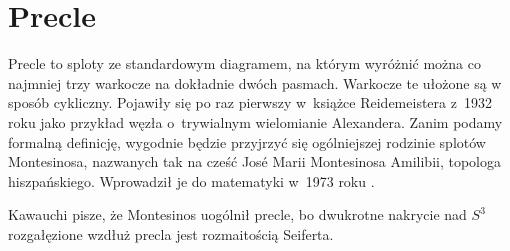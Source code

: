 
\section{Precle}
%
%
Precle to sploty ze standardowym diagramem, na którym wyróżnić można co najmniej trzy warkocze na dokładnie dwóch pasmach.
Warkocze te ułożone są w sposób cykliczny.
Pojawiły się po raz pierwszy w~książce Reidemeistera z~1932 roku jako przykład węzła o~trywialnym wielomianie Alexandera.
Zanim podamy formalną definicję, wygodnie będzie przyjrzyć się ogólniejszej rodzinie splotów Montesinosa, nazwanych tak na cześć José Marii Montesinosa Amilibii, topologa hiszpańskiego.
%
Wprowadził je do matematyki w~1973 roku \cite{montesinos1973}.

Kawauchi \cite[s. 29]{kawauchi1996} pisze, że Montesinos uogólnił precle, bo dwukrotne nakrycie nad $S^3$ rozgałęzione wzdłuż precla jest rozmaitością Seiferta.
%

